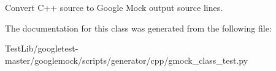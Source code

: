 \begin{DoxyVerb}Convert C++ source to Google Mock output source lines.\end{DoxyVerb}
 

The documentation for this class was generated from the following file\+:\begin{DoxyCompactItemize}
\item 
Test\+Lib/googletest-\/master/googlemock/scripts/generator/cpp/gmock\+\_\+class\+\_\+test.\+py\end{DoxyCompactItemize}

